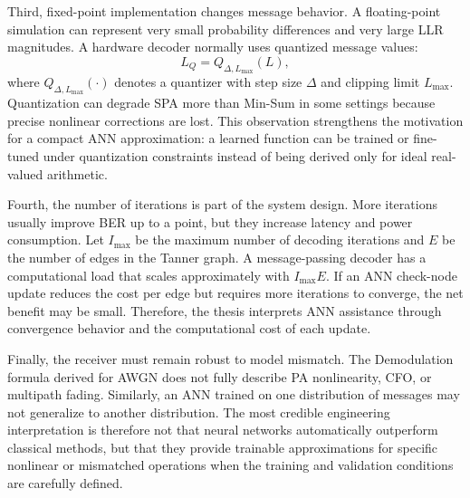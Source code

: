 Third, fixed-point implementation changes message behavior. A floating-point simulation can represent very small probability differences and very large LLR magnitudes. A hardware decoder normally uses quantized message values:
\begin{equation}
  L_Q=Q_{\Delta,L_{\max}}(L),
\end{equation}
where $Q_{\Delta,L_{\max}}(\cdot)$ denotes a quantizer with step size $\Delta$ and clipping limit $L_{\max}$. Quantization can degrade SPA more than Min-Sum in some settings because precise nonlinear corrections are lost. This observation strengthens the motivation for a compact ANN approximation: a learned function can be trained or fine-tuned under quantization constraints instead of being derived only for ideal real-valued arithmetic.

Fourth, the number of iterations is part of the system design. More iterations usually improve BER up to a point, but they increase latency and power consumption. Let $I_{\max}$ be the maximum number of decoding iterations and $E$ be the number of edges in the Tanner graph. A message-passing decoder has a computational load that scales approximately with $I_{\max}E$. If an ANN check-node update reduces the cost per edge but requires more iterations to converge, the net benefit may be small. Therefore, the thesis interprets ANN assistance through convergence behavior and the computational cost of each update.

Finally, the receiver must remain robust to model mismatch. The Demodulation formula derived for AWGN does not fully describe PA nonlinearity, CFO, or multipath fading. Similarly, an ANN trained on one distribution of messages may not generalize to another distribution. The most credible engineering interpretation is therefore not that neural networks automatically outperform classical methods, but that they provide trainable approximations for specific nonlinear or mismatched operations when the training and validation conditions are carefully defined.
